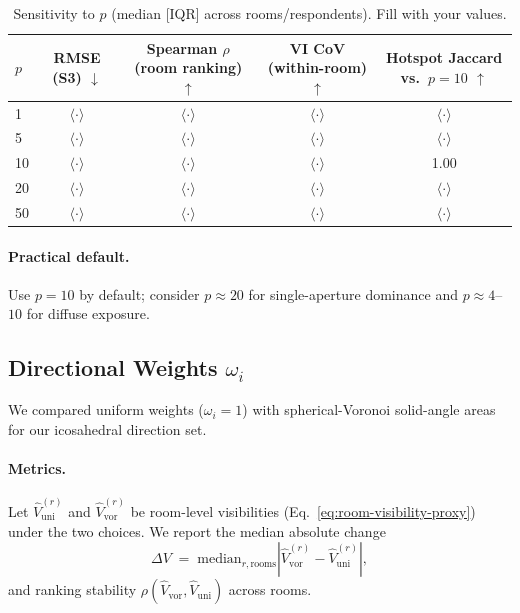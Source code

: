\documentclass[final,3p,times,review]{elsarticle}
\begin{document}
\begin{table}[H]
\centering
\caption{Sensitivity to $p$ (median [IQR] across rooms/respondents). Fill with your values.}
\label{tab:p-sweep}
\begin{tabular}{@{}lcccc@{}}
\toprule
$p$ & RMSE (S3) $\downarrow$ & Spearman $\rho$ (room ranking) $\uparrow$ & VI CoV (within-room) $\uparrow$ & Hotspot Jaccard vs.\ $p{=}10$ $\uparrow$ \\
\midrule
1  & $\langle\cdot\rangle$ & $\langle\cdot\rangle$ & $\langle\cdot\rangle$ & $\langle\cdot\rangle$ \\
5  & $\langle\cdot\rangle$ & $\langle\cdot\rangle$ & $\langle\cdot\rangle$ & $\langle\cdot\rangle$ \\
10 & $\langle\cdot\rangle$ & $\langle\cdot\rangle$ & $\langle\cdot\rangle$ & 1.00 \\
20 & $\langle\cdot\rangle$ & $\langle\cdot\rangle$ & $\langle\cdot\rangle$ & $\langle\cdot\rangle$ \\
50 & $\langle\cdot\rangle$ & $\langle\cdot\rangle$ & $\langle\cdot\rangle$ & $\langle\cdot\rangle$ \\
\bottomrule
\end{tabular}
\end{table}

\paragraph{Practical default.}
Use $p{=}10$ by default; consider $p{\approx}20$ for single-aperture dominance and $p{\approx}4$--$10$ for diffuse exposure.

\subsection{Directional Weights $\omega_i$}
We compared uniform weights ($\omega_i{=}1$) with spherical-Voronoi solid-angle areas for our icosahedral direction set.

\paragraph{Metrics.}
Let $\widehat{V}^{(r)}_{\text{uni}}$ and $\widehat{V}^{(r)}_{\text{vor}}$ be room-level visibilities (Eq.~\eqref{eq:room-visibility-proxy}) under the two choices. We report the median absolute change
\begin{equation}
\Delta V \;=\; \mathrm{median}_{r,\text{rooms}} \left| \widehat{V}^{(r)}_{\text{vor}} - \widehat{V}^{(r)}_{\text{uni}} \right|,
\label{eq:deltaV}
\end{equation}
and ranking stability $\rho(\widehat{V}_{\text{vor}},\widehat{V}_{\text{uni}})$ across rooms.
\end{document}
